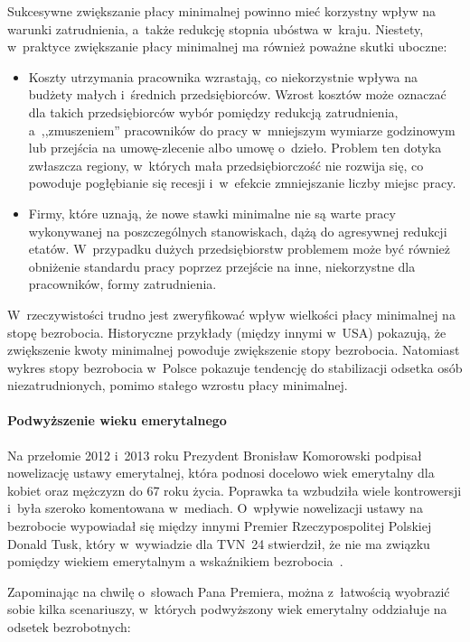 \documentclass[12pt]{article}
\begin{document}
    Sukcesywne zwiększanie płacy minimalnej powinno mieć korzystny wpływ na warunki zatrudnienia, a~także redukcję stopnia ubóstwa w~kraju. Niestety, w~praktyce zwiększanie płacy minimalnej ma również poważne skutki uboczne:
    
    \begin{itemize}
        \item Koszty utrzymania pracownika wzrastają, co niekorzystnie wpływa na budżety małych i~średnich przedsiębiorców. Wzrost kosztów może oznaczać dla takich przedsiębiorców wybór pomiędzy redukcją zatrudnienia, a~,,zmuszeniem'' pracowników do pracy w~mniejszym wymiarze godzinowym lub przejścia na umowę-zlecenie albo umowę o~dzieło. Problem ten dotyka zwłaszcza regiony, w~których mała przedsiębiorczość nie rozwija się, co powoduje pogłębianie się recesji i~w~efekcie zmniejszanie liczby miejsc pracy.
        \item Firmy, które uznają, że nowe stawki minimalne nie są warte pracy wykonywanej na poszczególnych stanowiskach, dążą do agresywnej redukcji etatów. W~przypadku dużych przedsiębiorstw problemem może być również obniżenie standardu pracy poprzez przejście na inne, niekorzystne dla pracowników, formy zatrudnienia.
    \end{itemize}

    W~rzeczywistości trudno jest zweryfikować wpływ wielkości płacy minimalnej na stopę bezrobocia. Historyczne przykłady (między innymi w~USA) pokazują, że zwiększenie kwoty minimalnej powoduje zwiększenie stopy bezrobocia. Natomiast wykres stopy bezrobocia w~Polsce pokazuje tendencję do stabilizacji odsetka osób niezatrudnionych, pomimo stałego wzrostu płacy minimalnej.
    
    \paragraph{Podwyższenie wieku emerytalnego}
    
    Na przełomie 2012 i~2013 roku Prezydent Bronisław Komorowski podpisał nowelizację ustawy emerytalnej, która podnosi docelowo wiek emerytalny dla kobiet oraz mężczyzn do 67 roku życia. Poprawka ta wzbudziła wiele kontrowersji i~była szeroko komentowana w~mediach. O~wpływie nowelizacji ustawy na bezrobocie wypowiadał się między innymi Premier Rzeczypospolitej Polskiej Donald Tusk, który w~wywiadzie dla TVN~24 stwierdził, że nie ma związku pomiędzy wiekiem emerytalnym a wskaźnikiem bezrobocia~\cite{premier}.
    
    Zapominając na chwilę o~słowach Pana Premiera, można z~łatwością wyobrazić sobie kilka scenariuszy, w~których podwyższony wiek emerytalny oddziałuje na odsetek bezrobotnych:
    
\end{document}
